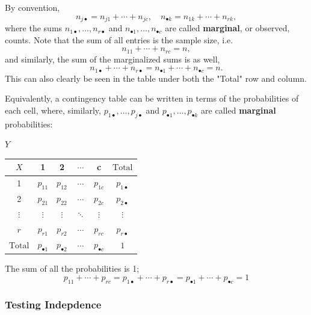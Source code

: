 \documentclass[12pt]{article}
\begin{document}
By convention, \[n_{j\bullet} = n_{j1} + \cdots + n_{jc}, \quad n_{\bullet k} = n_{1k} + \cdots + n_{rk},\] where the sums $n_{1\bullet}, \dots, n_{r\bullet}$ and $n_{\bullet 1}, \dots, n_{\bullet c}$ are called \textbf{marginal}, or observed, counts. 
Note that the sum of all entries is the sample size, i.e. \[n_{11} + \cdots + n_{rc} = n,\] and similarly, the sum of the marginalized sums is as well, \[n_{1\bullet} + \cdots + n_{r \bullet} = n_{\bullet 1} + \cdots + n_{\bullet c} = n.\] This can also clearly be seen in the table under both the "Total" row and column.

Equivalently, a contingency table can be written in terms of the probabilities of each cell, where, similarly, $p_{1 \bullet}, \dots, p_{j \bullet}$ and $p_{\bullet 1}, \dots, p_{\bullet k}$ are called \textbf{marginal} probabilities:


\begin{center}
    $Y$\\
    \begin{tabular}{c | c c c c | c}
        $X$ & 1 & 2 & $\cdots$ & c & $\text{Total}$\\
        \hline
        1 & $p_{11}$ & $p_{12}$ & $\cdots$ & $p_{1c}$ & $p_{1\bullet}$\\
        2 & $p_{21}$ & $p_{22}$ & $\cdots$ & $p_{2c}$ & $p_{2\bullet}$\\
        $\vdots$ & $\vdots$ & $\vdots$ & $\ddots$ & $\vdots$ & $\vdots$\\
        $r$ & $p_{r1}$ & $p_{r2}$ & $\cdots$ & $p_{rc}$ & $p_{r\bullet}$\\
        \hline
        $\text{Total}$ & $p_{\bullet 1}$ & $p_{\bullet 2}$ & $\cdots$ & $p_{\bullet c}$ & $1$\\
        \hline
    \end{tabular}
\end{center}

The sum of all the probabilities is 1; \[p_{11} + \cdots + p_{rc} = p_{1\bullet} + \cdots + p_{r\bullet} = p_{\bullet 1} + \cdots + p_{\bullet c} = 1\]

\subsubsection{Testing Indepdence}
\end{document}
